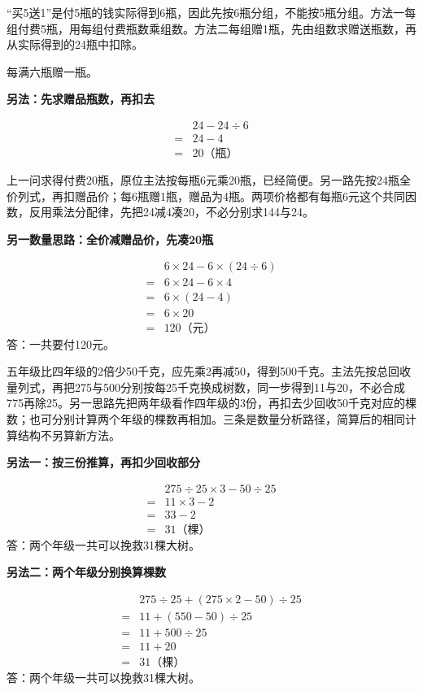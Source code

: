 \documentclass[multi=snippet,border=0pt]{standalone}
\newenvironment{snippet}[3]{\begin{minipage}{#1bp}\color{answerred}\fontsize{#2}{#3}\selectfont\raggedright}{\end{minipage}}
\begin{document}
\begin{snippet}{505}{11.5}{14}“买5送1”是付5瓶的钱实际得到6瓶，因此先按6瓶分组，不能按5瓶分组。方法一每组付费5瓶，用每组付费瓶数乘组数。方法二每组赠1瓶，先由组数求赠送瓶数，再从实际得到的24瓶中扣除。\par 每满六瓶赠一瓶。\par \textbf{另法：先求赠品瓶数，再扣去}\par \[\begin{aligned}&24-24\div6\\={}&24-4\\={}&20\text{（瓶）}\end{aligned}\]\end{snippet}
\begin{snippet}{505}{11.5}{14}上一问求得付费20瓶，原位主法按每瓶6元乘20瓶，已经简便。另一路先按24瓶全价列式，再扣赠品价；每6瓶赠1瓶，赠品为4瓶。两项价格都有每瓶6元这个共同因数，反用乘法分配律，先把24减4凑20，不必分别求144与24。\par \textbf{另一数量思路：全价减赠品价，先凑20瓶}\par \[\begin{aligned}&6\times24-6\times(24\div6)\\={}&6\times24-6\times4\\={}&6\times(24-4)\\={}&6\times20\\={}&120\text{（元）}\end{aligned}\]答：一共要付120元。\end{snippet}
\begin{snippet}{505}{11.5}{14}五年级比四年级的2倍少50千克，应先乘2再减50，得到500千克。主法先按总回收量列式，再把275与500分别按每25千克换成树数，同一步得到11与20，不必合成775再除25。另一思路先把两年级看作四年级的3份，再扣去少回收50千克对应的棵数；也可分别计算两个年级的棵数再相加。三条是数量分析路径，简算后的相同计算结构不另算新方法。\par \textbf{另法一：按三份推算，再扣少回收部分}\par \[\begin{aligned}&275\div25\times3-50\div25\\={}&11\times3-2\\={}&33-2\\={}&31\text{（棵）}\end{aligned}\]答：两个年级一共可以挽救31棵大树。\par \textbf{另法二：两个年级分别换算棵数}\par \[\begin{aligned}&275\div25+(275\times2-50)\div25\\={}&11+(550-50)\div25\\={}&11+500\div25\\={}&11+20\\={}&31\text{（棵）}\end{aligned}\]答：两个年级一共可以挽救31棵大树。\end{snippet}
\end{document}
